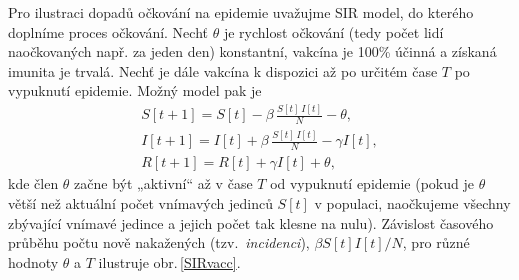 Pro ilustraci dopadů očkování na epidemie uvažujme SIR model, do kterého doplníme proces očkování. Nechť $\theta$ je rychlost očkování (tedy počet lidí naočkovaných např. za jeden den) konstantní, vakcína je 100\% účinná a získaná imunita je trvalá. Nechť je dále vakcína k dispozici až po určitém čase $T$ po vypuknutí epidemie. Možný model pak je
\begin{equation}
\begin{array}{l}
\displaystyle{S[t+1] = S[t] - \beta \, \frac{S[t]\,I[t]}{N} - \theta}, \\[3ex]
\displaystyle{I[t+1] = I[t] + \beta \, \frac{S[t]\,I[t]}{N} - \gamma I[t]}, \\[3ex]
\displaystyle{R[t+1] = R[t] + \gamma I[t] + \theta},
\end{array}
\label{modSIRV}
\end{equation}
kde člen $\theta$ začne být „aktivní“ až v čase $T$ od vypuknutí epidemie (pokud je $\theta$ větší než aktuální počet vnímavých jedinců $S[t]$ v populaci, naočkujeme všechny zbývající vnímavé jedince a jejich počet tak klesne na nulu). Závislost časového průběhu počtu nově nakažených (tzv.\ \emph{incidenci}), $\beta S[t] I[t]/N$, pro různé hodnoty $\theta$ a $T$ ilustruje obr.\,\ref{SIRvacc}.

